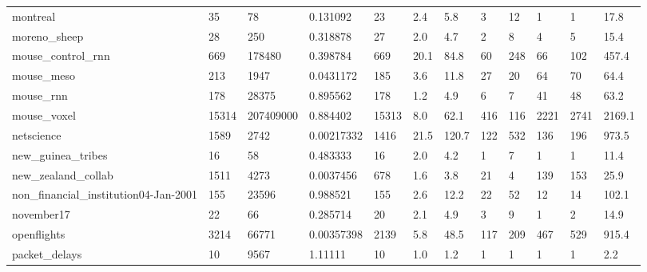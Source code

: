 \begin{longtable}{llllllllllll}
 montreal                                           & 35         & 78        & 0.131092    & 23    & 2.4    & 5.8    & 3     & 12     & 1      & 1      & 17.8    \\
 moreno\_sheep                                       & 28         & 250       & 0.318878    & 27    & 2.0    & 4.7    & 2     & 8      & 4      & 5      & 15.4    \\
 mouse\_control\_rnn                                  & 669        & 178480    & 0.398784    & 669   & 20.1   & 84.8   & 60    & 248    & 66     & 102    & 457.4   \\
 mouse\_meso                                         & 213        & 1947      & 0.0431172   & 185   & 3.6    & 11.8   & 27    & 20     & 64     & 70     & 64.4    \\
 mouse\_rnn                                          & 178        & 28375     & 0.895562    & 178   & 1.2    & 4.9    & 6     & 7      & 41     & 48     & 63.2    \\
 mouse\_voxel                                        & 15314      & 207409000 & 0.884402    & 15313 & 8.0    & 62.1   & 416   & 116    & 2221   & 2741   & 2169.1  \\
 netscience                                         & 1589       & 2742      & 0.00217332  & 1416  & 21.5   & 120.7  & 122   & 532    & 136    & 196    & 973.5   \\
 new\_guinea\_tribes                                  & 16         & 58        & 0.483333    & 16    & 2.0    & 4.2    & 1     & 7      & 1      & 1      & 11.4    \\
 new\_zealand\_collab                                 & 1511       & 4273      & 0.0037456   & 678   & 1.6    & 3.8    & 21    & 4      & 139    & 153    & 25.9    \\
 non\_financial\_institution04-Jan-2001               & 155        & 23596     & 0.988521    & 155   & 2.6    & 12.2   & 22    & 52     & 12     & 14     & 102.1   \\
 november17                                         & 22         & 66        & 0.285714    & 20    & 2.1    & 4.9    & 3     & 9      & 1      & 2      & 14.9    \\
 openflights                                        & 3214       & 66771     & 0.00357398  & 2139  & 5.8    & 48.5   & 117   & 209    & 467    & 529    & 915.4   \\
 packet\_delays                                      & 10         & 9567      & 1.11111     & 10    & 1.0    & 1.2    & 1     & 1      & 1      & 1      & 2.2     \\

\end{longtable}
